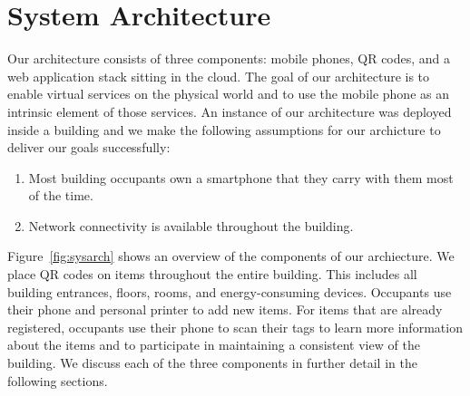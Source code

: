 \section{System Architecture}
Our architecture consists of three components: mobile phones, QR codes, and a web application stack sitting in
the cloud.  The goal of our architecture is to enable virtual services on the physical world and to use the mobile
phone as an intrinsic element of those services.  An instance of our architecture was deployed inside a building and we make the
following assumptions for our archicture to deliver our goals successfully:

\begin{enumerate}
\item Most building occupants own a smartphone that they carry with them most of the time.
\item Network connectivity is available throughout the building.
\end{enumerate}
\vspace{0.06in}

Figure~\ref{fig:sysarch} shows an overview of the components of our archiecture.  We place QR codes on items throughout
the entire building.  This includes all building entrances, floors, rooms, and energy-consuming devices.  Occupants
use their phone and personal printer to add new items.  For items that are already registered, occupants use their phone
to scan their tags to learn more information about the items and to participate in maintaining a consistent
view of the building.  We discuss each of the three components in further detail in the following sections.



